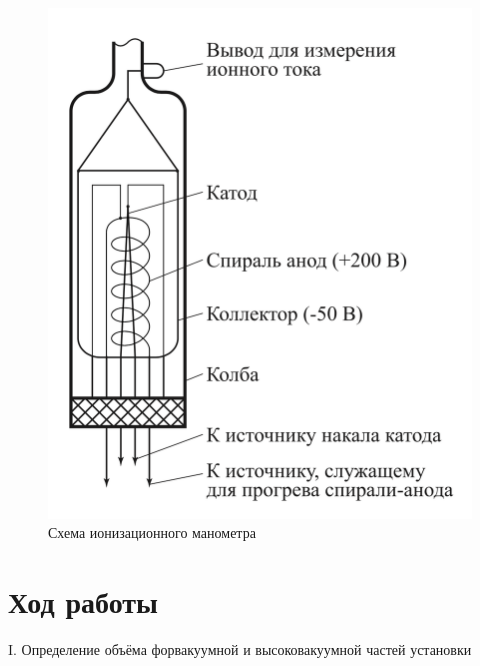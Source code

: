 \documentclass[a4paper,12pt]{article} %
\begin{document}
\begin{figure}[h!]
  \centering
  \includegraphics[scale = 0.3]{ion.png}
  \caption{Схема ионизационного манометра}
  \label{fig:ion}
\end{figure}

\section*{Ход работы}

\begin{center}
  \textsf{I. Определение объёма форвакуумной и высоковакуумной частей установки}
\end{center}
\end{document}
